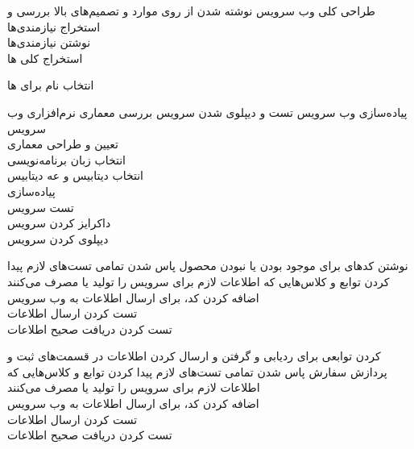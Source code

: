 \newpage
\begin{wbsbox}{}

\begin{wbssub}
{طراحی کلی وب ‌سرویس}
{نوشته شدن  از روی موارد و تصمیم‌های بالا}
\task
بررسی و استخراج نیازمندی‌ها \\
\task
نوشتن نیازمندی‌ها \\
\task
استخراج کلی
ها

\task
انتخاب نام برای ها
\end{wbssub}

\begin{wbssub}
{پیاده‌سازی وب ‌سرویس}
{تست و دیپلوی شدن سرویس}
\task
بررسی معماری نرم‌افزاری وب سرویس \\
\task
تعیین و طراحی معماری \\
\task
انتخاب زبان برنامه‌نویسی \\
\task
انتخاب دیتابیس و  عه دیتابیس \\
\task
پیاده‌سازی \\
\task
تست سرویس \\
\task
داکرایز کردن سرویس \\
\task
دیپلوی کردن سرویس
\end{wbssub}

\begin{wbssub}
{نوشتن کد‌های
برای موجود بودن یا نبودن محصول}
{پاس شدن تمامی تست‌های لازم}
\task 
پیدا کردن توابع و کلاس‌هایی که اطلاعات لازم برای سرویس را تولید یا مصرف می‌کنند \\
\task 
اضافه کردن کد، برای ارسال اطلاعات به وب ‌سرویس \\
\task
تست کردن ارسال اطلاعات \\
\task
تست کردن دریافت صحیح اطلاعات
\end{wbssub}

\begin{wbssub}
{ کردن توابعی برای ردیابی و گرفتن و ارسال کردن اطلاعات در قسمت‌های ثبت و پردازش سفارش}
{پاس شدن تمامی تست‌های لازم}
\task 
پیدا کردن توابع و کلاس‌هایی که اطلاعات لازم برای سرویس را تولید یا مصرف می‌کنند \\
\task 
اضافه کردن کد، برای ارسال اطلاعات به وب ‌سرویس \\
\task
تست کردن ارسال اطلاعات \\
\task
تست کردن دریافت صحیح اطلاعات
\end{wbssub}


\end{wbsbox}
